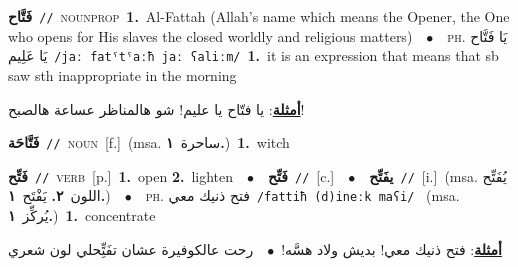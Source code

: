 \documentclass[10pt,a4paper,twoside]{article} %
\begin{document}
\begin{multicols}{2}
{\setlength\topsep{0pt}\textbf{\foreignlanguage{arabic}{فَتَّاح}}\ {\color{gray}\texttt{//}\color{black}}\ \textsc{noun\textunderscore prop}\ \textbf{1.}~Al-Fattah (Allah's name which means the Opener, the One who opens for His slaves the closed worldly and religious matters)\ \ $\bullet$\ \ \textsc{ph.} \color{gray} \foreignlanguage{arabic}{يَا فَتَّاح يَا عَلِيم}\color{black}\ {\color{gray}\texttt{/{\sffamily jaː fatˤtˤaːħ jaː ʕaliːm}/}\color{black}}\ \textbf{1.}~it is an expression that means that sb saw sth inappropriate in the morning\  \begin{flushright}\color{gray}\foreignlanguage{arabic}{\textbf{\underline{\foreignlanguage{arabic}{أمثلة}}}: يا فتّاح يا عليم! شو هالمناظر عساعة هالصبح!}\end{flushright}\color{black}} \vspace{2mm}

{\setlength\topsep{0pt}\textbf{\foreignlanguage{arabic}{فَتَّاحَة}}\ {\color{gray}\texttt{//}\color{black}}\ \textsc{noun}\ [f.]\ \color{gray}(msa. \foreignlanguage{arabic}{ساحرة}~\foreignlanguage{arabic}{\textbf{١.}})\color{black}\ \textbf{1.}~witch\ } \vspace{2mm}

{\setlength\topsep{0pt}\textbf{\foreignlanguage{arabic}{فَتِّح}}\ {\color{gray}\texttt{//}\color{black}}\ \textsc{verb}\ [p.]\ \textbf{1.}~open  \textbf{2.}~lighten\ \ $\bullet$\ \ \setlength\topsep{0pt}\textbf{\foreignlanguage{arabic}{فَتِّح}}\ {\color{gray}\texttt{//}\color{black}}\ [c.]\ \ $\bullet$\ \ \setlength\topsep{0pt}\textbf{\foreignlanguage{arabic}{يفَتِّح}}\ {\color{gray}\texttt{//}\color{black}}\ [i.]\ \color{gray}(msa. \foreignlanguage{arabic}{يُفَتِّح اللون}~\foreignlanguage{arabic}{\textbf{٢.}}  \foreignlanguage{arabic}{يَفْتَح}~\foreignlanguage{arabic}{\textbf{١.}})\color{black}\ \ $\bullet$\ \ \textsc{ph.} \color{gray} \foreignlanguage{arabic}{فتح ذنيك معي}\color{black}\ {\color{gray}\texttt{/{\sffamily fattiħ (d)ineːk maʕi}/}\color{black}}\ \color{gray} (msa. \foreignlanguage{arabic}{يُركِّز}~\foreignlanguage{arabic}{\textbf{١.}})\color{black}\ \textbf{1.}~concentrate\  \begin{flushright}\color{gray}\foreignlanguage{arabic}{\textbf{\underline{\foreignlanguage{arabic}{أمثلة}}}: فتح ذنيك معي! بديش ولاد هسَّه!\ $\bullet$\ \  رحت عالكوفيرة عشان تفَتِِّحلي لون شعري}\end{flushright}\color{black}} \vspace{2mm}


\end{multicols}
\end{document}

